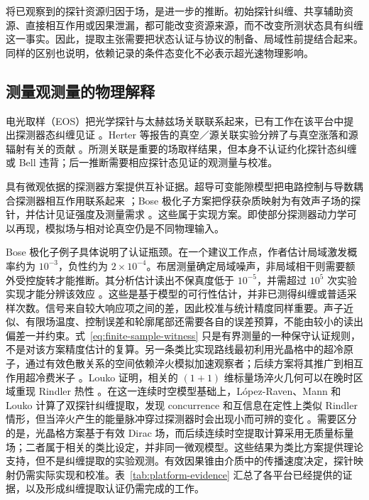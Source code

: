 \documentclass[UTF8,11pt,a4paper,fontset=none]{ctexart}
\begin{document}
将已观察到的探针资源归因于场，是进一步的推断。初始探针纠缠、共享辅助资源、直接相互作用或因果泄漏，都可能改变资源来源，而不改变所测状态具有纠缠这一事实。因此，提取主张需要把状态认证与协议的制备、局域性前提结合起来。同样的区别也说明，依赖记录的条件态变化不必表示超光速物理影响。

\subsection{测量观测量的物理解释}
电光取样（EOS）把光学探针与太赫兹场关联联系起来，已有工作在该平台中提出探测器态纠缠见证 \cite{Lindel2024}。Herter 等报告的真空／源关联实验分辨了与真空涨落和源辐射有关的贡献 \cite{Herter2026VacuumSource}。所测关联是重要的场取样结果，但本身不认证约化探针态纠缠或 Bell 违背；后一推断需要相应探针态见证的观测量与校准。

具有微观依据的探测器方案提供互补证据。超导可变能隙模型把电路控制与导数耦合探测器相互作用联系起来 \cite{TeixidoBonfill2026}；Bose 极化子方案把俘获杂质映射为有效声子场的探针，并估计见证强度及测量需求 \cite{PercheGozzini2026}。这些属于实现方案。即使部分探测器动力学可以再现，模拟场与相对论真空仍是不同物理输入。

Bose 极化子例子具体说明了认证瓶颈。在一个建议工作点，作者估计局域激发概率约为 $10^{-3}$，负性约为 $2\times10^{-4}$。布居测量确定局域噪声，非局域相干则需要额外受控旋转才能推断。其分析估计读出不保真度低于 $10^{-5}$，并需超过 $10^5$ 次实验实现才能分辨该效应 \cite{PercheGozzini2026}。这些是基于模型的可行性估计，并非已测得纠缠或普适采样次数。信号来自较大响应项之间的差，因此校准与统计精度同样重要。声子近似、有限场温度、控制误差和轮廓尾部还需要各自的误差预算，不能由较小的读出偏差一并约束。式~\eqref{eq:finite-sample-witness} 只是有界测量的一种保守认证规则，不是对该方案精度估计的复算。另一条类比实现路线最初利用光晶格中的超冷原子，通过有效色散关系的空间依赖淬火模拟加速观察者；后续方案将其推广到相互作用超冷费米子 \cite{RodriguezLaguna2017,KosiorLewensteinCeli2018}。Louko 证明，相关的 $(1+1)$ 维标量场淬火几何可以在晚时区域重现 Rindler 热性 \cite{Louko2018RindlerQuench}。在这一连续时空模型基础上，López-Raven、Mann 和 Louko 计算了双探针纠缠提取，发现 concurrence 和互信息在定性上类似 Rindler 情形，但当淬火产生的能量脉冲穿过探测器时会出现小而可辨的变化 \cite{LopezRavenMannLouko2025}。需要区分的是，光晶格方案基于有效 Dirac 场，而后续连续时空提取计算采用无质量标量场；二者属于相关的类比设定，并非同一微观模型。这些结果为类比方案提供理论支持，但不是纠缠提取的实验观测。有效因果锥由介质中的传播速度决定，探针映射仍需实际实现和校准。表~\ref{tab:platform-evidence} 汇总了各平台已经提供的证据，以及形成纠缠提取认证仍需完成的工作。
\end{document}
